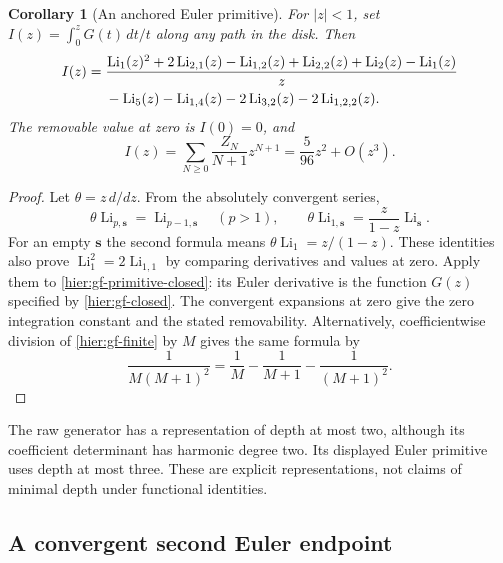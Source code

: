 \documentclass[11pt]{article}
\newtheorem{corollary}[theorem]{Corollary}
\theoremstyle{definition}
\theoremstyle{remark}
\numberwithin{equation}{section}
\begin{document}
\begin{corollary}[An anchored Euler primitive]
\label{hier:gf-primitive}
For $|z|<1$, set
$I(z)=\int_0^zG(t)\,dt/t$ along any path in the disk.  Then
\begin{align}\label{hier:gf-primitive-closed}
 I(z)={}&\frac{
 \operatorname{Li}_1(z)^2+2\operatorname{Li}_{2,1}(z)
 -\operatorname{Li}_{1,2}(z)+\operatorname{Li}_{2,2}(z)
 +\operatorname{Li}_2(z)-\operatorname{Li}_1(z)}{z}\notag\\
 &-\operatorname{Li}_5(z)-\operatorname{Li}_{1,4}(z)
     -2\operatorname{Li}_{3,2}(z)
     -2\operatorname{Li}_{1,2,2}(z).
\end{align}
The removable value at zero is $I(0)=0$, and
\[
 I(z)=\sum_{N\ge0}\frac{Z_N}{N+1}z^{N+1}
     =\frac5{96}z^2+O(z^3).
\]
\end{corollary}
\begin{proof}
Let $\theta=z\,d/dz$.  From the absolutely convergent series,
\[
 \theta\operatorname{Li}_{p,\boldsymbol s}
      =\operatorname{Li}_{p-1,\boldsymbol s}\quad(p>1),\qquad
 \theta\operatorname{Li}_{1,\boldsymbol s}
      =\frac{z}{1-z}\operatorname{Li}_{\boldsymbol s}.
\]
For an empty $\boldsymbol s$ the second formula means
$\theta\operatorname{Li}_1=z/(1-z)$.
These identities also prove
$\operatorname{Li}_1^2=2\operatorname{Li}_{1,1}$ by comparing
derivatives and values at zero.  Apply them to
\eqref{hier:gf-primitive-closed}: its Euler derivative is the function $G(z)$ specified by
\eqref{hier:gf-closed}.  The convergent expansions at zero give the
zero integration constant and the stated removability.  Alternatively,
coefficientwise division of \eqref{hier:gf-finite} by $M$ gives the
same formula by
\[
 \frac1{M(M+1)^2}
  =\frac1M-\frac1{M+1}-\frac1{(M+1)^2}.
\]
\end{proof}

The raw generator has a representation of depth at most two, although
its coefficient determinant has harmonic degree two.  Its displayed
Euler primitive uses depth at most three.  These are explicit
representations, not claims of minimal depth under functional identities.

\subsection{A convergent second Euler endpoint}
\end{document}

